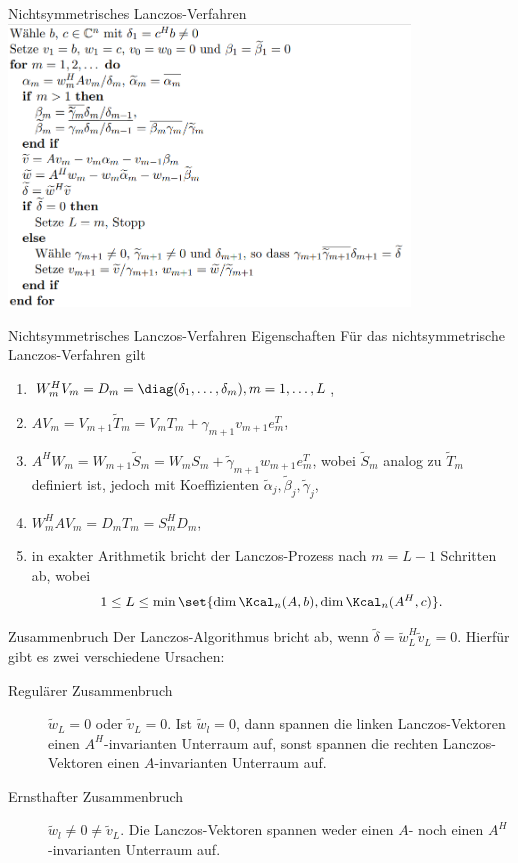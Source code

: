 \begin{karte}{Nichtsymmetrisches Lanczos-Verfahren}
    \includegraphics[width=0.8\textwidth]{Nichtsymmetrisches-Lanczos-Verfahren.png}
\end{karte}

\begin{karte}{Nichtsymmetrisches Lanczos-Verfahren Eigenschaften}
    Für das nichtsymmetrische Lanczos-Verfahren gilt 
    \begin{enumerate}
        \item \( W_m^H V_m = D_m = \diag(\delta_1, \ldots, \delta_m), m = 1,\ldots, L \),
        \item \( A V_m = V_{m+1} \tilde{T}_m = V_m T_m + \gamma_{m+1} v_{m+1} e_m^T \),
        \item \( A^H W_m = W_{m+1} \tilde{S}_m = W_m S_m + \tilde{\gamma}_{m+1} w_{m+1} e_m^T \), 
        wobei \(\tilde{S}_m\) analog zu \(\tilde{T}_m\) definiert ist, jedoch mit Koeffizienten 
        \( \tilde{\alpha}_j, \tilde{\beta}_j, \tilde{\gamma}_j \), 
        \item \( W_m^H A V_m = D_m T_m = S_m^H D_m \),
        \item in exakter Arithmetik bricht der Lanczos-Prozess nach \(m= L-1\) 
        Schritten ab, wobei 
        \[ 1 \leq L \leq \min\set{ \dim \Kcal_n(A,b), \dim \Kcal_n(A^H, c) }. \]
    \end{enumerate}
\end{karte}

\begin{karte}{Zusammenbruch}
    Der Lanczos-Algorithmus bricht ab, wenn 
    \( \tilde{\delta} = \tilde{w}_L^H \tilde{v}_L = 0 \). 
    Hierfür gibt es zwei verschiedene Ursachen:
    \begin{description}
        \item[Regulärer Zusammenbruch] \( \tilde{w}_L = 0 \) 
        oder \( \tilde{v}_L = 0\). Ist \( \tilde{w}_l = 0 \), 
        dann spannen die linken Lanczos-Vektoren einen \(A^H\)-invarianten 
        Unterraum auf, sonst spannen die rechten Lanczos-Vektoren einen 
        \(A\)-invarianten Unterraum auf.
        \item[Ernsthafter Zusammenbruch] \( \tilde{w}_l \neq 0 \neq \tilde{v}_L \). 
        Die Lanczos-Vektoren spannen weder einen \(A\)- noch einen \(A^H\)-invarianten 
        Unterraum auf.
    \end{description}
\end{karte}

